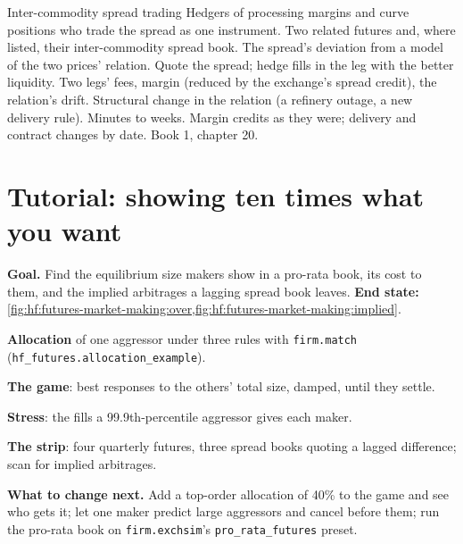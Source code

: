 \begin{strategyfile}{Inter-commodity spread trading}\label{strat:hf:futures-market-making:intercommodity}
 Hedgers of processing margins and curve positions who trade the spread as one instrument.
 Two related futures and, where listed, their inter-commodity spread book.
 The spread's deviation from a model of the two prices' relation.
 Quote the spread; hedge fills in the leg with the better liquidity.
 Two legs' fees, margin (reduced by the exchange's spread credit), the relation's drift.
 Structural change in the relation (a refinery outage, a new delivery rule).
 Minutes to weeks.
 Margin credits as they were; delivery and contract changes by date.
 Book 1, chapter 20.
\end{strategyfile}

\section{Tutorial: showing ten times what you want}\label{tut:hf:futures-market-making:tut}

\begin{tutorial}
\textbf{Goal.} Find the equilibrium size makers show in a pro-rata book, its cost to them, and the implied arbitrages a lagging spread book leaves.
\textbf{End state:} \cref{fig:hf:futures-market-making:over,fig:hf:futures-market-making:implied}.
\begin{tutsteps}
\item \textbf{Allocation} of one aggressor under three rules with \texttt{firm.match} (\texttt{hf\_futures.allocation\_example}).
\item \textbf{The game}: best responses to the others' total size, damped, until they settle.
\label{lst:hf:futures-market-making:game}
\item \textbf{Stress}: the fills a 99.9th-percentile aggressor gives each maker.
\item \textbf{The strip}: four quarterly futures, three spread books quoting a lagged difference; scan for implied arbitrages.
\label{lst:hf:futures-market-making:scan}
\end{tutsteps}
\textbf{What to change next.} Add a top-order allocation of 40\% to the game and see who gets it; let one maker predict large aggressors and cancel
before them; run the pro-rata book on \texttt{firm.exchsim}'s \texttt{pro\_rata\_futures} preset.
\end{tutorial}

